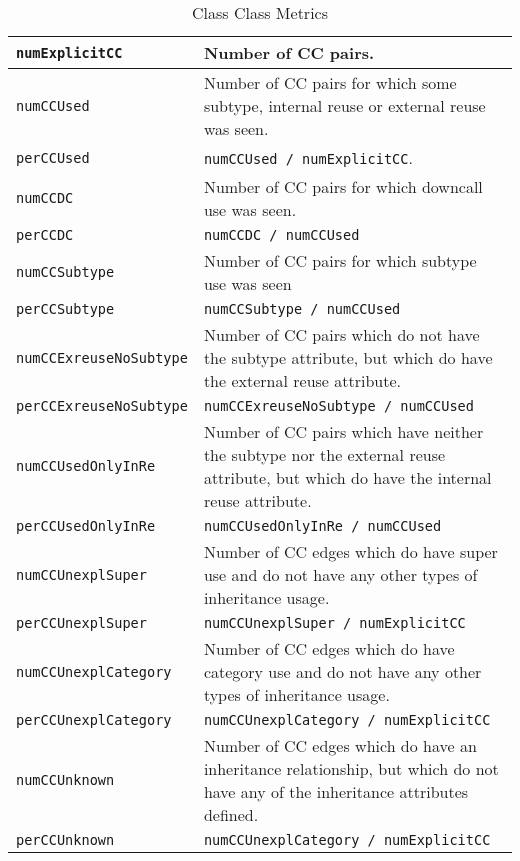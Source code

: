\documentclass{uvamscse}
\begin{document}
\begin{table} [h!]
\begin{flushleft}
\begin{tabular}[c]{| p{40mm} | p{110mm} |}
  \hline
  \texttt{numExplicitCC} &  Number of CC pairs.\\
  \hline  
  \texttt{numCCUsed} &  Number of CC pairs for which some subtype, internal reuse or external reuse was	seen. \\
  \texttt{perCCUsed} &  \texttt{numCCUsed / numExplicitCC}.\\
  \hline
  \texttt{numCCDC} 	 &   Number of CC pairs for which downcall use was seen.\\
  \texttt{perCCDC}   &   \texttt{numCCDC / numCCUsed} \\
  \hline
  \texttt{numCCSubtype} &  Number of CC pairs for which subtype use was seen \\
  \texttt{perCCSubtype} &  \texttt{numCCSubtype / numCCUsed} \\
  \hline
  \texttt{numCCExreuseNoSubtype} &  Number of CC pairs which do not have the subtype attribute, but which do have the external reuse attribute. \\
  \texttt{perCCExreuseNoSubtype} & \texttt{numCCExreuseNoSubtype / numCCUsed}  \\
  \hline
  \texttt{numCCUsedOnlyInRe} & Number of CC pairs which have neither the subtype nor the external reuse attribute, but which do have the internal reuse attribute. \\
  \texttt{perCCUsedOnlyInRe} &   \texttt{numCCUsedOnlyInRe / numCCUsed} \\
  \hline
  \texttt{numCCUnexplSuper} & Number of CC edges which do have super use and do not have any other types of inheritance usage. \\
  \texttt{perCCUnexplSuper} & 	\texttt{numCCUnexplSuper / numExplicitCC } \\
  \hline 
  \texttt{numCCUnexplCategory} & Number of CC edges which do have category use and do not have any other types of inheritance usage. \\
  \texttt{perCCUnexplCategory} & 	\texttt{numCCUnexplCategory / numExplicitCC } \\
  \hline 
  \texttt{numCCUnknown} & Number of CC edges which do have an inheritance relationship, but which do not have any of the inheritance attributes defined. \\
  \texttt{perCCUnknown} & 	\texttt{numCCUnexplCategory / numExplicitCC } \\
  \hline 
\end{tabular}
\end{flushleft}
\caption{Class Class Metrics}
\label{table:CCMetrics}
\end{table}
\end{document}
